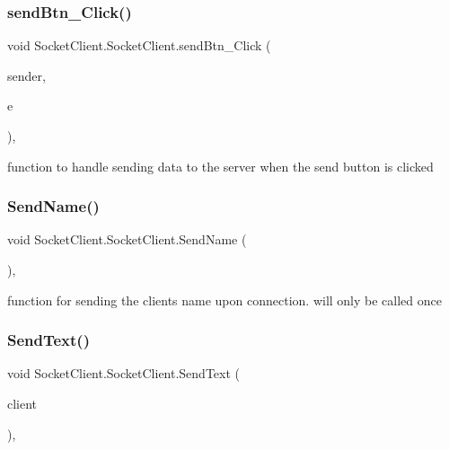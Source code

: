 \subsubsection{\texorpdfstring{send\+Btn\+\_\+\+Click()}{sendBtn\_Click()}}
{\footnotesize\ttfamily void Socket\+Client.\+Socket\+Client.\+send\+Btn\+\_\+\+Click (\begin{DoxyParamCaption}\item[{object}]{sender,  }\item[{Event\+Args}]{e }\end{DoxyParamCaption})\hspace{0.3cm}{\ttfamily [inline]}, {\ttfamily [private]}}

function to handle sending data to the server when the send button is clicked \mbox{\label{class_socket_client_1_1_socket_client_aa5bdeccde8564ade04ece861218ba7f3}} 
\subsubsection{\texorpdfstring{Send\+Name()}{SendName()}}
{\footnotesize\ttfamily void Socket\+Client.\+Socket\+Client.\+Send\+Name (\begin{DoxyParamCaption}{ }\end{DoxyParamCaption})\hspace{0.3cm}{\ttfamily [inline]}, {\ttfamily [private]}}

function for sending the clients name upon connection. will only be called once \mbox{\label{class_socket_client_1_1_socket_client_a0ffad9543c6accf3fa6a6d957b34feb9}} 
\subsubsection{\texorpdfstring{Send\+Text()}{SendText()}}
{\footnotesize\ttfamily void Socket\+Client.\+Socket\+Client.\+Send\+Text (\begin{DoxyParamCaption}\item[{\hyperlink{class_socket_client_1_1_client}{Client}}]{client }\end{DoxyParamCaption})\hspace{0.3cm}{\ttfamily [inline]}, {\ttfamily [private]}}

